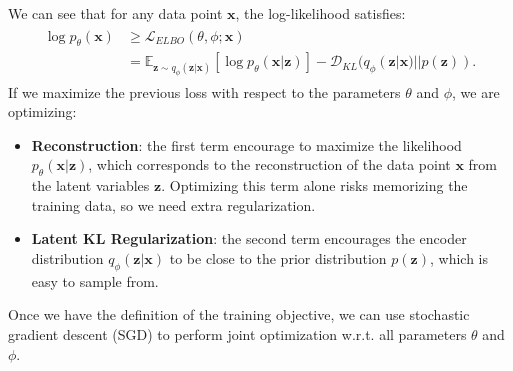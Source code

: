 We can see that for any data point $\mathbf{x}$, the log-likelihood satisfies: 
\begin{align}\label{eq:vae_loss}
\begin{split}
    \log p_{\theta}(\mathbf{x}) &\geq \mathcal{L}_{ELBO}(\theta, \phi; \mathbf{x}) \\
    & = \mathbb{E}_{\mathbf{z}\sim q_{\phi}(\mathbf{z}|\mathbf{x})} \left[\log p_{\theta}(\mathbf{x}|\mathbf{z})\right] - \mathcal{D}_{KL}(q_{\phi}(\mathbf{z}|\mathbf{x}) || p(\mathbf{z})).
\end{split}
\end{align}
If we maximize the previous loss with respect to the parameters $\theta$ and $\phi$, we are optimizing: 
\begin{itemize}
    \item \textbf{Reconstruction}: the first term encourage to maximize the likelihood $p_{\theta}(\mathbf{x}|\mathbf{z})$, which corresponds to the reconstruction of the data point $\mathbf{x}$ from the latent variables $\mathbf{z}$. Optimizing this term alone risks memorizing the training data, so we need extra regularization. 
    \item \textbf{Latent KL Regularization}: the second term encourages the encoder distribution $q_{\phi}(\mathbf{z}|\mathbf{x})$ to be close to the prior distribution $p(\mathbf{z})$, which is easy to sample from. 
\end{itemize}
Once we have the definition of the training objective, we can use stochastic gradient descent (SGD) to perform joint optimization w.r.t. all parameters $\theta$ and $\phi$. 
